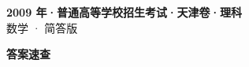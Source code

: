\documentclass[zihao=-4, a4paper]{ctexart}
\begin{document}
\begin{center}
  {\Large\bfseries 2009 年·普通高等学校招生考试·天津卷·理科}\\[4pt]
  {\large 数学 · 简答版}
\end{center}
\medskip
{}

\clearpage
{}
\begin{center}{\Large\bfseries 答案速查}\end{center}
\medskip

\end{document}
